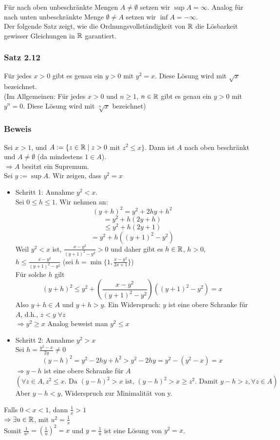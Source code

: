 \vspace{-10pt}

Für nach oben unbeschränkte Mengen $A\not=\emptyset$ setzen wir $\sup A=\infty$. Analog für nach unten unbeschränkte Menge $\emptyset\not= A$ setzen wir $\inf A=-\infty$.
\\
Der folgende Satz zeigt, wie die Ordnungsvollständigkeit von $\mathbb{R}$ die Lösbarkeit gewisser Gleichungen in $\mathbb{R}$ garantiert.

\subsubsection*{Satz 2.12}
Für jedes $x>0$ gibt es genau ein $y>0$ mit $y^2=x$. Diese Lösung wird mit $\sqrt{x}$ bezeichnet.\\

(Im Allgemeinen: Für jedes $x>0$ und $n\geq 1$, $n\in\mathbb{R}$ gibt es genau ein $y>0$ mit $y^n=0$. Diese Lösung wird mit $\sqrt[n]{x}$ bezeichnet)
\subsubsection*{Beweis}
Sei $x>1$, und $A:=\{ z\in\mathbb{R}\mid z>0$ mit $z^2\leq x\}$. Dann ist $A$ nach oben beschränkt und $A\not=\emptyset$ (da mindestens $1\in A$). \\
$\Rightarrow A$ besitzt ein Supremum. \\
Sei $y:=\sup A$. Wir zeigen, dass $y^2=x$
\begin{itemize}
    \item Schritt 1: Annahme $y^2<x$. \\
    Sei $0\leq h\leq 1$.  Wir nehmen an: \[\left( y+h\right)^2=y^2+2hy+h^2\]
    \[=y^2+h(2y+h)\]
    \[\leq y^2+h(2y+1)\]
    \[=y^2 +h\left( (y+1)^2 -y^2\right)\]
    Weil $y^2<x$ ist, $\frac{x-y^2}{(y+1)^2-y^2}>0$ und daher gibt es $h\in\mathbb{R}$, $h>0$, $h\leq\frac{x-y^2}{(y+1)^2-y^2}$ (sei $h=\min \{1,\frac{x-y^2}{2x+1}\}$)\\

    Für solche $h$ gilt \[(y+h)^2\leq y^2 + \left( \frac{x-y^2}{(y+1)^2-y^2}\right)\left( (y+1)^2 -y^2\right)=x\] Also $y+h\in A$ und $y+h>y$. Ein Widerspruch: $y$ ist eine obere Schranke für $A$, d.h., $z<y \; \forall z$\\$\Rightarrow y^2\geq x$ Analog beweist man $y^2\leq x$
    \item Schritt 2: Annahme $y^2>x$\\
    Sei $h=\frac{y^2-x}{2y}\not=0$
    \[(y-h)^2=y^2-2hy+h^2>y^2-2hy=y^2 -(y^2-x)=x\]
    $\Rightarrow y-h$ ist eine obere Schranke für $A$
    \[\left( \forall z \in A, z^2\leq x\text{. Da }(y-h)^2>x \text{ ist, } (y-h)^2>x\geq z^2\text{. Damit } y-h>z, \forall z \in A\right)\]
    Aber $y-h<y$, Widerspruch zur Minimalität von y.
\end{itemize}
Falls $0<x<1$, dann $\frac{1}{x}>1$\\
$\Rightarrow \exists u\in\mathbb{R}$, mit $u^2=\frac{1}{x}$\\
Somit $ \frac{1}{u^2} = \left( \frac{1}{u}\right)^2=x$ und $y=\frac{1}{u}$ ist eine Lösung von $y^2=x$.\\

